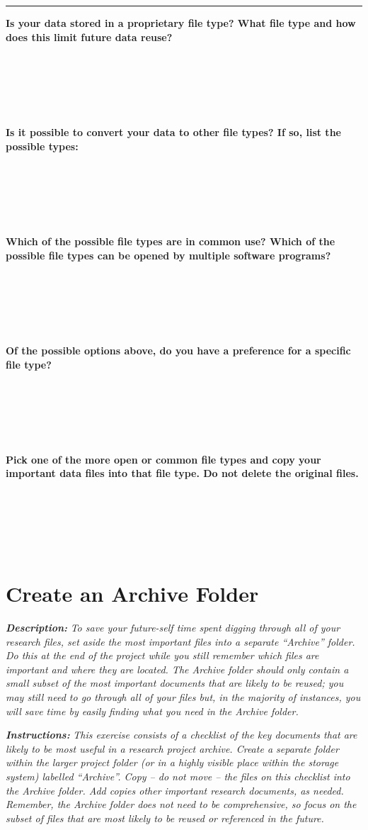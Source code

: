 \documentclass[
]{book}
\begin{document}
\begin{center}\rule{0.5\linewidth}{0.5pt}\end{center}

\textbf{Is your data stored in a proprietary file type? What file type and how does this limit future data reuse?}

~

~

~

\textbf{Is it possible to convert your data to other file types? If so, list the possible types:}

~

~

~

\textbf{Which of the possible file types are in common use? Which of the possible file types can be opened by multiple software programs?}

~

~

~

\textbf{Of the possible options above, do you have a preference for a specific file type?}

~

~

~

\textbf{Pick one of the more open or common file types and copy your important data files into that file type. Do not delete the original files.}

~

~

~

\hypertarget{archive-folder}{%
\section{Create an Archive Folder}\label{archive-folder}}

\textbf{\emph{Description:}} \emph{To save your future-self time spent digging through all of your research files, set aside the most important files into a separate ``Archive'' folder. Do this at the end of the project while you still remember which files are important and where they are located. The Archive folder should only contain a small subset of the most important documents that are likely to be reused; you may still need to go through all of your files but, in the majority of instances, you will save time by easily finding what you need in the Archive folder.}

\textbf{\emph{Instructions:}} \emph{This exercise consists of a checklist of the key documents that are likely to be most useful in a research project archive. Create a separate folder within the larger project folder (or in a highly visible place within the storage system) labelled ``Archive''. Copy -- do not move -- the files on this checklist into the Archive folder. Add copies other important research documents, as needed. Remember, the Archive folder does not need to be comprehensive, so focus on the subset of files that are most likely to be reused or referenced in the future.}
\end{document}
